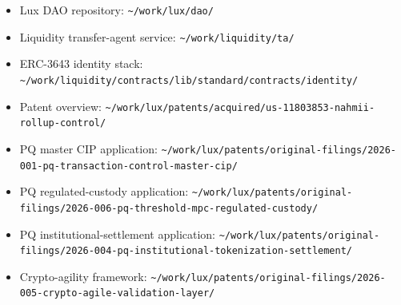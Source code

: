 \documentclass[11pt,letterpaper]{article}
\begin{document}
\begin{itemize}
\item Lux DAO repository: \texttt{\textasciitilde/work/lux/dao/}
\item Liquidity transfer-agent service: \texttt{\textasciitilde/work/liquidity/ta/}
\item ERC-3643 identity stack: \texttt{\textasciitilde/work/liquidity/contracts/lib/standard/contracts/identity/}
\item Patent overview: \texttt{\textasciitilde/work/lux/patents/acquired/us-11803853-nahmii-rollup-control/}
\item PQ master CIP application: \texttt{\textasciitilde/work/lux/patents/original-filings/2026-001-pq-transaction-control-master-cip/}
\item PQ regulated-custody application: \texttt{\textasciitilde/work/lux/patents/original-filings/2026-006-pq-threshold-mpc-regulated-custody/}
\item PQ institutional-settlement application: \texttt{\textasciitilde/work/lux/patents/original-filings/2026-004-pq-institutional-tokenization-settlement/}
\item Crypto-agility framework: \texttt{\textasciitilde/work/lux/patents/original-filings/2026-005-crypto-agile-validation-layer/}
\end{itemize}
\end{document}
